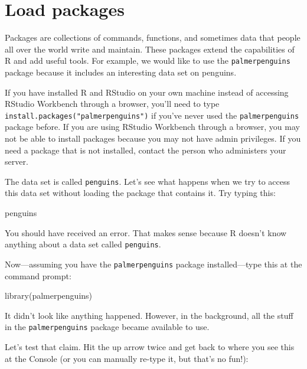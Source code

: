 \documentclass[
]{book}
\newenvironment{Shaded}{\begin{snugshade}}{\end{snugshade}}
\newcommand{\FunctionTok}[1]{\textcolor[rgb]{0.00,0.00,0.00}{#1}}
\newcommand{\NormalTok}[1]{#1}
\begin{document}
\hypertarget{intror-loadpackages}{%
\section{Load packages}\label{intror-loadpackages}}

Packages are collections of commands, functions, and sometimes data that people all over the world write and maintain. These packages extend the capabilities of R and add useful tools. For example, we would like to use the \texttt{palmerpenguins} package because it includes an interesting data set on penguins.

If you have installed R and RStudio on your own machine instead of accessing RStudio Workbench through a browser, you'll need to type \texttt{install.packages("palmerpenguins")} if you've never used the \texttt{palmerpenguins} package before. If you are using RStudio Workbench through a browser, you may not be able to install packages because you may not have admin privileges. If you need a package that is not installed, contact the person who administers your server.

The data set is called \texttt{penguins}. Let's see what happens when we try to access this data set without loading the package that contains it. Try typing this:

\begin{Shaded}
\begin{Highlighting}[]
\NormalTok{penguins}
\end{Highlighting}
\end{Shaded}

You should have received an error. That makes sense because R doesn't know anything about a data set called \texttt{penguins}.

Now---assuming you have the \texttt{palmerpenguins} package installed---type this at the command prompt:

\begin{Shaded}
\begin{Highlighting}[]
\FunctionTok{library}\NormalTok{(palmerpenguins)}
\end{Highlighting}
\end{Shaded}

It didn't look like anything happened. However, in the background, all the stuff in the \texttt{palmerpenguins} package became available to use.

Let's test that claim. Hit the up arrow twice and get back to where you see this at the Console (or you can manually re-type it, but that's no fun!):
\end{document}
